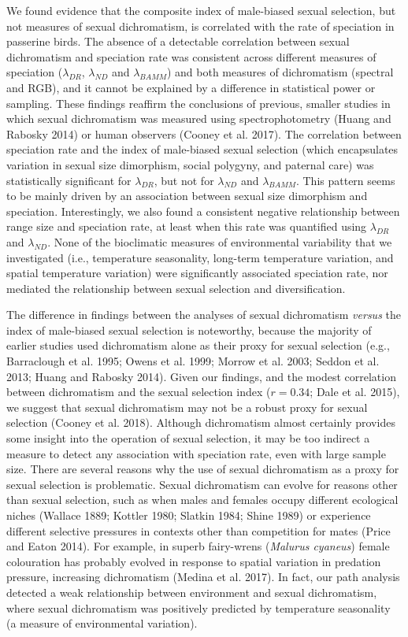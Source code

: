 \documentclass[]{article}
\begin{document}
We found evidence that the composite index of male-biased sexual
selection, but not measures of sexual dichromatism, is correlated with
the rate of speciation in passerine birds. The absence of a detectable
correlation between sexual dichromatism and speciation rate was
consistent across different measures of speciation (\(\lambda_{DR}\),
\(\lambda_{ND}\) and \(\lambda_{BAMM}\)) and both measures of
dichromatism (spectral and RGB), and it cannot be explained by a
difference in statistical power or sampling. These findings reaffirm the
conclusions of previous, smaller studies in which sexual dichromatism
was measured using spectrophotometry (Huang and Rabosky 2014) or human
observers (Cooney et al. 2017). The correlation between speciation rate
and the index of male-biased sexual selection (which encapsulates
variation in sexual size dimorphism, social polygyny, and paternal care)
was statistically significant for \(\lambda_{DR}\), but not for
\(\lambda_{ND}\) and \(\lambda_{BAMM}\). This pattern seems to be mainly
driven by an association between sexual size dimorphism and speciation.
Interestingly, we also found a consistent negative relationship between
range size and speciation rate, at least when this rate was quantified
using \(\lambda_{DR}\) and \(\lambda_{ND}\). None of the bioclimatic
measures of environmental variability that we investigated (i.e.,
temperature seasonality, long-term temperature variation, and spatial
temperature variation) were significantly associated speciation rate,
nor mediated the relationship between sexual selection and
diversification.

The difference in findings between the analyses of sexual dichromatism
\emph{versus} the index of male-biased sexual selection is noteworthy,
because the majority of earlier studies used dichromatism alone as their
proxy for sexual selection (e.g., Barraclough et al. 1995; Owens et al.
1999; Morrow et al. 2003; Seddon et al. 2013; Huang and Rabosky 2014).
Given our findings, and the modest correlation between dichromatism and
the sexual selection index (\(r = 0.34\); Dale et al. 2015), we suggest
that sexual dichromatism may not be a robust proxy for sexual selection
(Cooney et al. 2018). Although dichromatism almost certainly provides
some insight into the operation of sexual selection, it may be too
indirect a measure to detect any association with speciation rate, even
with large sample size. There are several reasons why the use of sexual
dichromatism as a proxy for sexual selection is problematic. Sexual
dichromatism can evolve for reasons other than sexual selection, such as
when males and females occupy different ecological niches (Wallace 1889;
Kottler 1980; Slatkin 1984; Shine 1989) or experience different
selective pressures in contexts other than competition for mates (Price
and Eaton 2014). For example, in superb fairy-wrens (\emph{Malurus
cyaneus}) female colouration has probably evolved in response to spatial
variation in predation pressure, increasing dichromatism (Medina et al.
2017). In fact, our path analysis detected a weak relationship between
environment and sexual dichromatism, where sexual dichromatism was
positively predicted by temperature seasonality (a measure of
environmental variation).
\end{document}
